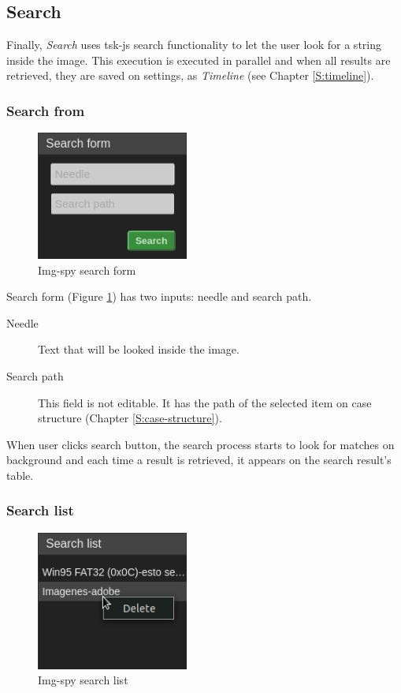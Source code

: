 \subsection{Search}

Finally, \textit{Search} uses tsk-js search functionality to let the
user look for a string inside the image. This execution is executed in parallel
and when all results are retrieved, they are saved on settings, as
\textit{Timeline} (see Chapter \ref{S:timeline}).

\subsubsection{Search from}

\begin{figure}
	\includegraphics[width=5cm]
	{./figures/search-form.png}
	\centering
	\caption{Img-spy search form}
	\label{F:img-spy-search-form}
\end{figure}

Search form (Figure \ref{F:img-spy-search-form}) has two inputs: needle and
search path.

\begin{description}
	\item[Needle] Text that will be looked inside the image.
	\item[Search path] This field is not editable. It has the path of the
	selected item on case structure (Chapter \ref{S:case-structure}).
\end{description}

When user clicks search button, the search process starts to look for matches
on background and each time a result is retrieved, it appears on the search
result's table.

\subsubsection{Search list}

\begin{figure}
	\includegraphics[width=5cm]
	{./figures/search-list.png}
	\centering
	\caption{Img-spy search list}
	\label{F:img-spy-search-list}
\end{figure}

